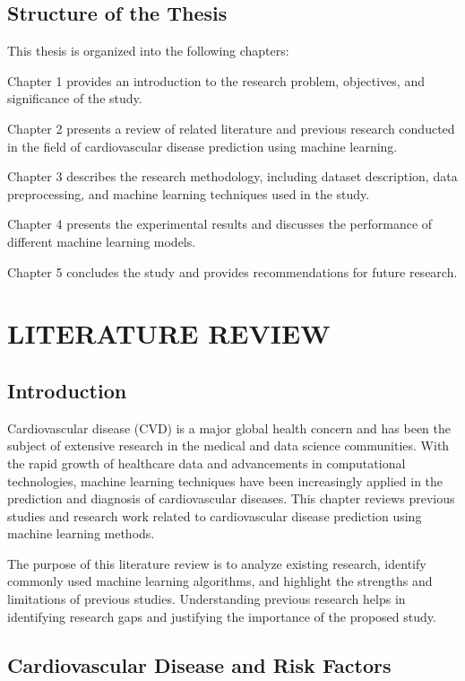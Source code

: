 \section{Structure of the Thesis}

This thesis is organized into the following chapters:

Chapter 1 provides an introduction to the research problem, objectives, and significance of the study.

Chapter 2 presents a review of related literature and previous research conducted in the field of cardiovascular disease prediction using machine learning.

Chapter 3 describes the research methodology, including dataset description, data preprocessing, and machine learning techniques used in the study.

Chapter 4 presents the experimental results and discusses the performance of different machine learning models.

Chapter 5 concludes the study and provides recommendations for future research.

\chapter{LITERATURE REVIEW}

\section{Introduction}

Cardiovascular disease (CVD) is a major global health concern and has been the subject of extensive research in the medical and data science communities. With the rapid growth of healthcare data and advancements in computational technologies, machine learning techniques have been increasingly applied in the prediction and diagnosis of cardiovascular diseases. This chapter reviews previous studies and research work related to cardiovascular disease prediction using machine learning methods.

The purpose of this literature review is to analyze existing research, identify commonly used machine learning algorithms, and highlight the strengths and limitations of previous studies. Understanding previous research helps in identifying research gaps and justifying the importance of the proposed study.

\section{Cardiovascular Disease and Risk Factors}

